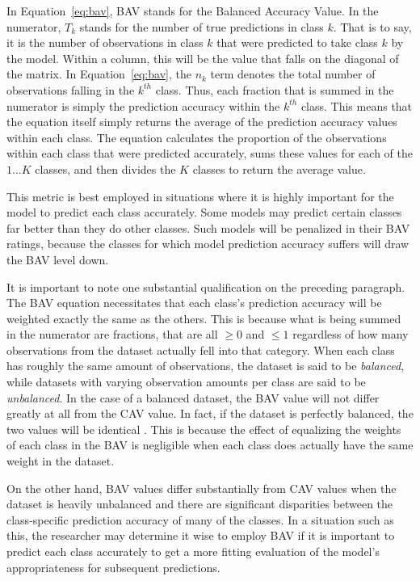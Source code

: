 \documentclass[12pt]{article}
\begin{document}
In Equation~\eqref{eq:bav}, BAV stands for the Balanced Accuracy Value.  In the 
numerator, $T_k$ stands for the number of true predictions in class $k$.  That 
is to say, it is the number of observations in class $k$ that were predicted to 
take class $k$ by the model.  Within a column, this will be the value that falls 
on the diagonal of the matrix.  In Equation~\eqref{eq:bav}, the $n_k$ term denotes 
the total number of observations falling in the $k^{th}$ class.  Thus, each fraction 
that is summed in the numerator is simply the prediction accuracy within the $k^{th}$ 
class.  This means that the equation itself simply returns the average of the 
prediction accuracy values within each class.  The equation calculates the proportion 
of the observations within each class that were predicted accurately, sums these 
values for each of the $1...K$ classes, and then divides the $K$ classes to return 
the average value.

This metric is best employed in situations where it is highly important for the model 
to predict each class accurately.  Some models may predict certain classes far better 
than they do other classes.  Such models will be penalized in their BAV ratings, 
because the classes for which model prediction accuracy suffers will draw the BAV 
level down. 

It is important to note one substantial qualification on the preceding paragraph.  
The BAV equation necessitates that each class's prediction accuracy will be weighted 
exactly the same as the others.  This is because what is being summed in the numerator 
are fractions, that are all $\geq 0$ and $\leq 1$ regardless of how many observations 
from the dataset actually fell into that category.  When each class has roughly the 
same amount of observations, the dataset is said to be \textit{balanced}, while 
datasets with varying observation amounts per class are said to be \textit{unbalanced}.  
In the case of a balanced dataset, the BAV value will not differ greatly at all from 
the CAV value.  In fact, if the dataset is perfectly balanced, the two values will be 
identical \citep{grandini2020metrics}.  This is because the effect of equalizing the 
weights of each class in the BAV is negligible when each class does actually have the 
same weight in the dataset.

On the other hand, BAV values differ substantially from CAV values when the dataset is 
heavily unbalanced and there are significant disparities between the class-specific 
prediction accuracy of many of the classes.  In a situation such as this, the 
researcher may determine it wise to employ BAV if it is important to predict each 
class accurately to get a more fitting evaluation of the model's appropriateness for 
subsequent predictions.  
\end{document}
